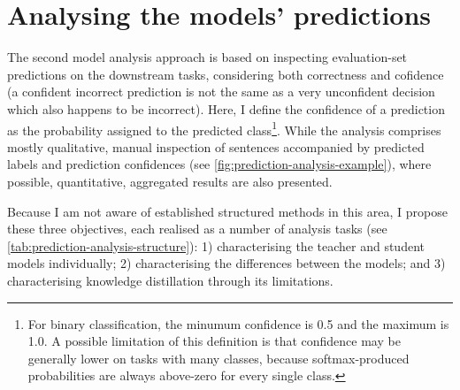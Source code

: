 \documentclass[bsc,frontabs,singlespacing,parskip,deptreport]{infthesis}
\begin{document}
{  \section{Analysing the models' predictions}{
    The second model analysis approach is based on inspecting evaluation-set predictions on the downstream tasks,
    considering both correctness and cofidence (a confident incorrect prediction is not the same as a very unconfident decision which also happens to be incorrect).
    Here, I define the confidence of a prediction as the probability assigned to the predicted class\footnote{For binary classification, the minumum confidence is 0.5 and the maximum is 1.0. A possible limitation of this definition is that confidence may be generally lower on tasks with many classes, because softmax-produced probabilities are always above-zero for every single class.}.
    While the analysis comprises mostly qualitative, manual inspection of sentences accompanied by predicted labels and prediction confidences (see \autoref{fig:prediction-analysis-example}), where possible, quantitative, aggregated results are also presented.

    Because I am not aware of established structured methods in this area, I propose these three objectives, each realised as a number of analysis tasks (see \autoref{tab:prediction-analysis-structure}):
    1) characterising the teacher and student models individually;
    2) characterising the differences between the models;
    and 3) characterising knowledge distillation through its limitations.

}}
\end{document}
